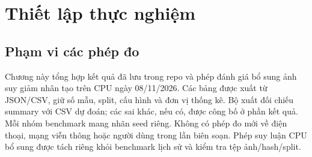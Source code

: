 \section{Thiết lập thực nghiệm}\label{sec:04-evaluation-setup}
\subsection{Phạm vi các phép đo}
Chương này tổng hợp kết quả đã lưu trong repo và phép đánh giá bổ sung ảnh suy giảm nhân tạo trên CPU ngày 08/11/2026. Các bảng được xuất từ JSON/CSV, giữ số mẫu, split, cấu hình và đơn vị thống kê. Bộ xuất đối chiếu summary với CSV dự đoán; các sai khác, nếu có, được công bố ở phần kết quả. Mỗi nhóm benchmark mang nhãn seed riêng. Không có phép đo mới về điện thoại, mạng viễn thông hoặc người dùng trong lần biên soạn. Phép suy luận CPU bổ sung được tách riêng khỏi benchmark lịch sử và kiểm tra tệp ảnh/hash/split.


